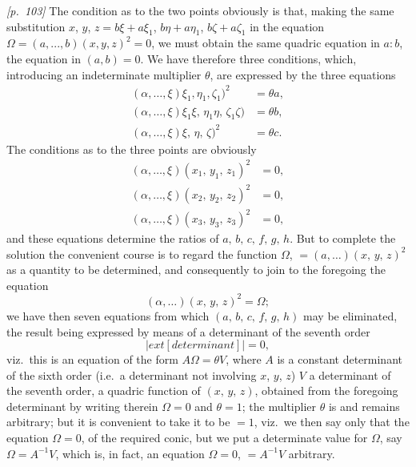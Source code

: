 \documentclass[11pt,a4paper]{book}
\begin{document}
\bigskip\noindent\textit{[p.~103]} The condition as to the two points obviously is that, making the same substitution $x$, $y$, $z = b\xi + a\xi_1$, $b\eta + a\eta_1$, $b\zeta + a\zeta_1$ in the equation $\Omega = (a, ..., b)(x, y, z)^2 = 0$, we must obtain the same quadric equation in $a:b$, the equation in $(a, b) = 0$. We have therefore three conditions, which, introducing an indeterminate multiplier $\theta$, are expressed by the three equations
\begin{align*}
(\alpha, \ldots, \xi)\xi_1, \eta_1, \zeta_1)^2 &= \theta a,\\
(\alpha, \ldots, \xi)\xi_1\xi,\, \eta_1\eta,\, \zeta_1\zeta) &= \theta b,\\
(\alpha, \ldots, \xi)\xi,\, \eta,\, \zeta)^2 &= \theta c.
\end{align*}
The conditions as to the three points are obviously
\begin{align*}
(\alpha, \ldots, \xi)(x_1,\,y_1,\,z_1)^2 &= 0,\\
(\alpha, \ldots, \xi)(x_2,\,y_2,\,z_2)^2 &= 0,\\
(\alpha, \ldots, \xi)(x_3,\,y_3,\,z_3)^2 &= 0,
\end{align*}
and these equations determine the ratios of $a,\,b,\,c,\,f,\,g,\,h$. But to complete the solution the convenient course is to regard the function $\Omega$, $= (a, \ldots)(x,\,y,\,z)^2$ as a quantity to be determined, and consequently to join to the foregoing the equation
\[
(\alpha, \ldots)(x,\,y,\,z)^2 = \Omega;
\]
we have then seven equations from which $(a,\,b,\,c,\,f,\,g,\,h)$ may be eliminated, the result being expressed by means of a determinant of the seventh order
\[
\left|
	ext{[determinant]}
\right| = 0,
\]
viz.\ this is an equation of the form $A\Omega = \theta V$, where $A$ is a constant determinant of the sixth order (i.e.\ a determinant not involving $x$, $y$, $z$) $V$ a determinant of the seventh order, a quadric function of $(x,\,y,\,z)$, obtained from the foregoing determinant by writing therein $\Omega = 0$ and $\theta = 1$; the multiplier $\theta$ is and remains arbitrary; but it is convenient to take it to be $= 1$, viz.\ we then say only that the equation $\Omega = 0$, of the required conic, but we put a determinate value for $\Omega$, say $\Omega = A^{-1}V$, which is, in fact, an equation $\Omega = 0$, $= A^{-1}V$ arbitrary.

\bigskip

\end{document}
